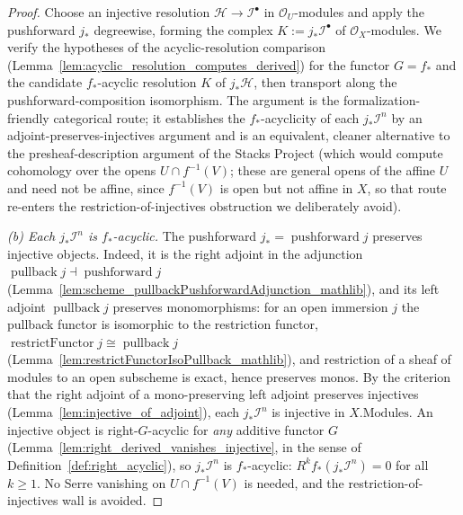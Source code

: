 \begin{proof}
    \leanok
  Choose an injective resolution \(\mathcal{H} \to \mathcal{I}^\bullet\) in
  \(\mathcal{O}_U\)-modules and apply the pushforward \(j_*\) degreewise, forming the complex
  \(K := j_*\mathcal{I}^\bullet\) of \(\mathcal{O}_X\)-modules. We verify the hypotheses of the
  acyclic-resolution comparison (Lemma~\ref{lem:acyclic_resolution_computes_derived}) for the
  functor \(G = f_*\) and the candidate \(f_*\)-acyclic resolution \(K\) of \(j_*\mathcal{H}\), then
  transport along the pushforward-composition isomorphism. The argument is the
  formalization-friendly categorical route; it establishes the \(f_*\)-acyclicity of each
  \(j_*\mathcal{I}^n\) by an adjoint-preserves-injectives argument and is an equivalent, cleaner
  alternative to the presheaf-description argument of the Stacks Project (which would compute
  cohomology over the opens \(U \cap f^{-1}(V)\); these are general opens of the affine \(U\) and
  need not be affine, since \(f^{-1}(V)\) is open but not affine in \(X\), so that route re-enters
  the restriction-of-injectives obstruction we deliberately avoid).

  \emph{(b) Each \(j_*\mathcal{I}^n\) is \(f_*\)-acyclic.} The pushforward
  \(j_* = \operatorname{pushforward} j\) preserves injective objects. Indeed, it is the right
  adjoint in the adjunction \(\operatorname{pullback} j \dashv \operatorname{pushforward} j\)
  (Lemma~\ref{lem:scheme_pullbackPushforwardAdjunction_mathlib}), and its left adjoint
  \(\operatorname{pullback} j\) preserves monomorphisms: for an open immersion \(j\) the pullback
  functor is isomorphic to the restriction functor,
  \(\operatorname{restrictFunctor} j \cong \operatorname{pullback} j\)
  (Lemma~\ref{lem:restrictFunctorIsoPullback_mathlib}), and restriction of a sheaf of modules to an
  open subscheme is exact, hence preserves monos. By the criterion that the right adjoint of a
  mono-preserving left adjoint preserves injectives (Lemma~\ref{lem:injective_of_adjoint}), each
  \(j_*\mathcal{I}^n\) is injective in \(X.\mathrm{Modules}\). An injective object is
  right-\(G\)-acyclic for \emph{any} additive functor \(G\)
  (Lemma~\ref{lem:right_derived_vanishes_injective}, in the sense of
  Definition~\ref{def:right_acyclic}), so \(j_*\mathcal{I}^n\) is \(f_*\)-acyclic:
  \(R^k f_*(j_*\mathcal{I}^n) = 0\) for all \(k \geq 1\). No Serre vanishing on
  \(U \cap f^{-1}(V)\) is needed, and the restriction-of-injectives wall is avoided.


\end{proof}
